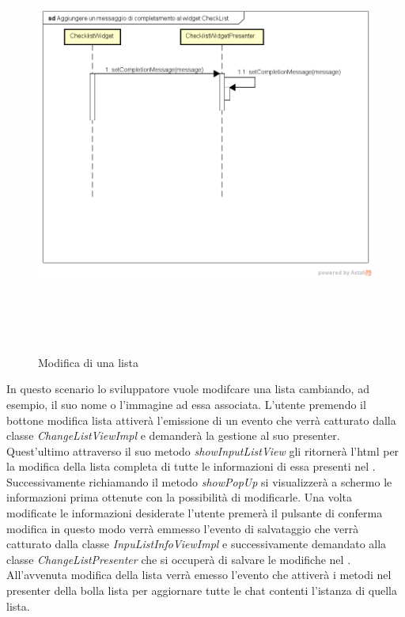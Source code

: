 \label{Modifca di un lista}
\begin{figure}[H]
	\centering
	\includegraphics[width=16cm, height=14cm]{Sezioni/Diagrammi/img/Aggiungere un messaggio di completamento al widget Checklist.png}
	\caption{Modifica di una lista}
\end{figure}

In questo scenario lo sviluppatore vuole modifcare una lista cambiando, ad esempio, il suo nome o l'immagine ad essa associata. L'utente premendo il bottone modifica lista attiverà l'emissione di un evento che verrà catturato dalla classe \textit{ChangeListViewImpl} e demanderà la  gestione al suo presenter. Quest'ultimo attraverso il suo  metodo \textit{showInputListView} gli ritornerà l'html per la modifica della lista completa di tutte le informazioni di essa presenti nel . Successivamente richiamando il metodo \textit{showPopUp} si visualizzerà a schermo  le informazioni prima ottenute con la possibilità di modificarle. Una volta modificate le informazioni desiderate l'utente premerà il pulsante di conferma modifica in questo modo verrà emmesso l'evento di salvataggio che verrà catturato dalla classe \textit{InpuListInfoViewImpl} e successivamente demandato alla classe \textit{ChangeListPresenter} che si occuperà di salvare le modifiche nel .
All'avvenuta modifica della lista  verrà emesso l'evento che attiverà i metodi nel presenter della bolla lista per aggiornare tutte le chat contenti l'istanza di quella lista.
 
